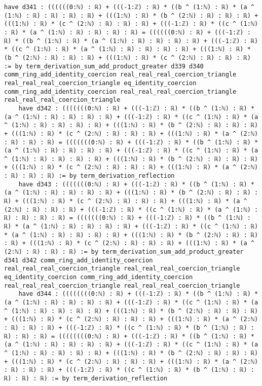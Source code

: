 \documentclass{article}
\begin{document}
\begin{tcolorbox}[colback=white!10, width=\linewidth]
\begin{lstlisting}[language=Lean4]
    have d341 : ((((((0:ℕ) : ℝ) + (((-1:ℤ) : ℝ) * ((b ^ (1:ℕ) : ℝ) * (a ^ (1:ℕ) : ℝ) : ℝ) : ℝ) : ℝ) + (((1:ℕ) : ℝ) * (b ^ (2:ℕ) : ℝ) : ℝ) : ℝ) + (((1:ℕ) : ℝ) * (c ^ (2:ℕ) : ℝ) : ℝ) : ℝ) + (((-1:ℤ) : ℝ) * ((c ^ (1:ℕ) : ℝ) * (a ^ (1:ℕ) : ℝ) : ℝ) : ℝ) : ℝ) = ((((((0:ℕ) : ℝ) + (((-1:ℤ) : ℝ) * ((b ^ (1:ℕ) : ℝ) * (a ^ (1:ℕ) : ℝ) : ℝ) : ℝ) : ℝ) + (((-1:ℤ) : ℝ) * ((c ^ (1:ℕ) : ℝ) * (a ^ (1:ℕ) : ℝ) : ℝ) : ℝ) : ℝ) + (((1:ℕ) : ℝ) * (b ^ (2:ℕ) : ℝ) : ℝ) : ℝ) + (((1:ℕ) : ℝ) * (c ^ (2:ℕ) : ℝ) : ℝ) : ℝ) := by term_derivation_sum_add_product_greater d339 d340 comm_ring_add_identity_coercion real_real_real_coercion_triangle real_real_real_coercion_triangle eq_identity_coercion comm_ring_add_identity_coercion real_real_real_coercion_triangle real_real_real_coercion_triangle
    have d342 : (((((((0:ℕ) : ℝ) + (((-1:ℤ) : ℝ) * ((b ^ (1:ℕ) : ℝ) * (a ^ (1:ℕ) : ℝ) : ℝ) : ℝ) : ℝ) + (((-1:ℤ) : ℝ) * ((c ^ (1:ℕ) : ℝ) * (a ^ (1:ℕ) : ℝ) : ℝ) : ℝ) : ℝ) + (((1:ℕ) : ℝ) * (b ^ (2:ℕ) : ℝ) : ℝ) : ℝ) + (((1:ℕ) : ℝ) * (c ^ (2:ℕ) : ℝ) : ℝ) : ℝ) + (((1:ℕ) : ℝ) * (a ^ (2:ℕ) : ℝ) : ℝ) : ℝ) = (((((((0:ℕ) : ℝ) + (((-1:ℤ) : ℝ) * ((b ^ (1:ℕ) : ℝ) * (a ^ (1:ℕ) : ℝ) : ℝ) : ℝ) : ℝ) + (((-1:ℤ) : ℝ) * ((c ^ (1:ℕ) : ℝ) * (a ^ (1:ℕ) : ℝ) : ℝ) : ℝ) : ℝ) + (((1:ℕ) : ℝ) * (b ^ (2:ℕ) : ℝ) : ℝ) : ℝ) + (((1:ℕ) : ℝ) * (c ^ (2:ℕ) : ℝ) : ℝ) : ℝ) + (((1:ℕ) : ℝ) * (a ^ (2:ℕ) : ℝ) : ℝ) : ℝ) := by term_derivation_reflection
    have d343 : (((((((0:ℕ) : ℝ) + (((-1:ℤ) : ℝ) * ((b ^ (1:ℕ) : ℝ) * (a ^ (1:ℕ) : ℝ) : ℝ) : ℝ) : ℝ) + (((1:ℕ) : ℝ) * (b ^ (2:ℕ) : ℝ) : ℝ) : ℝ) + (((1:ℕ) : ℝ) * (c ^ (2:ℕ) : ℝ) : ℝ) : ℝ) + (((1:ℕ) : ℝ) * (a ^ (2:ℕ) : ℝ) : ℝ) : ℝ) + (((-1:ℤ) : ℝ) * ((c ^ (1:ℕ) : ℝ) * (a ^ (1:ℕ) : ℝ) : ℝ) : ℝ) : ℝ) = (((((((0:ℕ) : ℝ) + (((-1:ℤ) : ℝ) * ((b ^ (1:ℕ) : ℝ) * (a ^ (1:ℕ) : ℝ) : ℝ) : ℝ) : ℝ) + (((-1:ℤ) : ℝ) * ((c ^ (1:ℕ) : ℝ) * (a ^ (1:ℕ) : ℝ) : ℝ) : ℝ) : ℝ) + (((1:ℕ) : ℝ) * (b ^ (2:ℕ) : ℝ) : ℝ) : ℝ) + (((1:ℕ) : ℝ) * (c ^ (2:ℕ) : ℝ) : ℝ) : ℝ) + (((1:ℕ) : ℝ) * (a ^ (2:ℕ) : ℝ) : ℝ) : ℝ) := by term_derivation_sum_add_product_greater d341 d342 comm_ring_add_identity_coercion real_real_real_coercion_triangle real_real_real_coercion_triangle eq_identity_coercion comm_ring_add_identity_coercion real_real_real_coercion_triangle real_real_real_coercion_triangle
    have d344 : ((((((((0:ℕ) : ℝ) + (((-1:ℤ) : ℝ) * ((b ^ (1:ℕ) : ℝ) * (a ^ (1:ℕ) : ℝ) : ℝ) : ℝ) : ℝ) + (((-1:ℤ) : ℝ) * ((c ^ (1:ℕ) : ℝ) * (a ^ (1:ℕ) : ℝ) : ℝ) : ℝ) : ℝ) + (((1:ℕ) : ℝ) * (b ^ (2:ℕ) : ℝ) : ℝ) : ℝ) + (((1:ℕ) : ℝ) * (c ^ (2:ℕ) : ℝ) : ℝ) : ℝ) + (((1:ℕ) : ℝ) * (a ^ (2:ℕ) : ℝ) : ℝ) : ℝ) + (((-1:ℤ) : ℝ) * ((c ^ (1:ℕ) : ℝ) * (b ^ (1:ℕ) : ℝ) : ℝ) : ℝ) : ℝ) = ((((((((0:ℕ) : ℝ) + (((-1:ℤ) : ℝ) * ((b ^ (1:ℕ) : ℝ) * (a ^ (1:ℕ) : ℝ) : ℝ) : ℝ) : ℝ) + (((-1:ℤ) : ℝ) * ((c ^ (1:ℕ) : ℝ) * (a ^ (1:ℕ) : ℝ) : ℝ) : ℝ) : ℝ) + (((1:ℕ) : ℝ) * (b ^ (2:ℕ) : ℝ) : ℝ) : ℝ) + (((1:ℕ) : ℝ) * (c ^ (2:ℕ) : ℝ) : ℝ) : ℝ) + (((1:ℕ) : ℝ) * (a ^ (2:ℕ) : ℝ) : ℝ) : ℝ) + (((-1:ℤ) : ℝ) * ((c ^ (1:ℕ) : ℝ) * (b ^ (1:ℕ) : ℝ) : ℝ) : ℝ) : ℝ) := by term_derivation_reflection

\end{lstlisting}
\end{tcolorbox}
\end{document}
